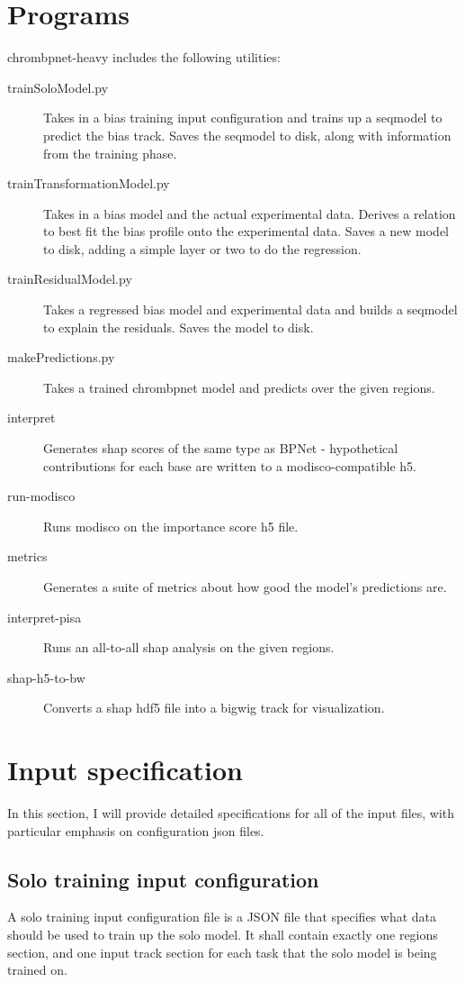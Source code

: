 \documentclass{article}
\begin{document}
\section{Programs}
chrombpnet-heavy includes the following utilities:
\begin{description}
    \item [trainSoloModel.py] Takes in a bias training input configuration and trains up a seqmodel to predict the bias track. Saves the seqmodel to disk, along with information from the training phase. 
    \item [trainTransformationModel.py] Takes in a bias model and the actual experimental data. Derives a relation to best fit the bias profile onto the experimental data. Saves a new model to disk, adding a simple layer or two to do the regression. 
    \item [trainResidualModel.py] Takes a regressed bias model and experimental data and builds a seqmodel to explain the residuals. Saves the model to disk. 
    \item [makePredictions.py] Takes a trained chrombpnet model and predicts over the given regions. 
    \item [interpret] Generates shap scores of the same type as BPNet - hypothetical contributions for each base are written to a modisco-compatible h5. 
    \item [run-modisco] Runs modisco on the importance score h5 file. 
    \item [metrics] Generates a suite of metrics about how good the model's predictions are. 
    \item [interpret-pisa] Runs an all-to-all shap analysis on the given regions. 
    \item [shap-h5-to-bw] Converts a shap hdf5 file into a bigwig track for visualization. 
\end{description}


\section{Input specification}
In this section, I will provide detailed specifications for all of the input files, with particular emphasis on configuration json files.

\subsection{Solo training input configuration}
A solo training input configuration file is a JSON file that specifies what data should be used to train up the solo model.
It shall contain exactly one regions section, and one input track section for each task that the solo model is being trained on. 
\end{document}
